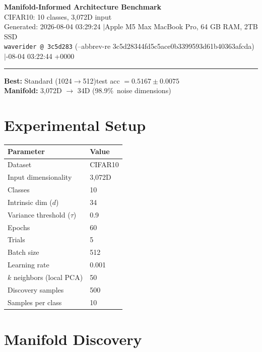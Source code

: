 \documentclass[11pt,letterpaper]{article}
\begin{document}
\begin{center}
  {\LARGE\bfseries\color{wavblue} Manifold-Informed Architecture Benchmark}\\[6pt]
  {\large CIFAR10: 10 classes, 3,072D input}\\[8pt]
  {\small Generated: 2026-08-04 03:29:24 \quad$|$\quad Apple M5 Max MacBook Pro, 64 GB RAM, 2TB SSD}\\[2pt]
  {\small\texttt{waverider @ 3c5d283} (--abbrev-re
3c5d28344fd5c5ace0b3399593d61b40363afcda) \quad$|$-08-04 03:22:44 +0000}
\end{center}
{\color{wavblue}\noindent\rule{\linewidth}{1.5pt}}
\medskip

\noindent\colorbox{wavlight}{\parbox{\dimexpr\linewidth-2\fboxsep\relax}{
  \smallskip
  \textbf{Best:} Standard (1024$\rightarrow$512)\quad test acc $= 0.5167 \pm 0.0075$\\[2pt]
  \textbf{Manifold:} 3,072D $\rightarrow$ 34D (98.9\%\ noise dimensions)\\[2pt]
  \smallskip
}}
\bigskip

\section{Experimental Setup}

\begin{tabular}{@{}ll@{}}
\toprule
\textbf{Parameter} & \textbf{Value} \\
\midrule
  Dataset & CIFAR10 \\
  Input dimensionality & 3,072D \\
  Classes & 10 \\
  Intrinsic dim ($d$) & 34 \\
  Variance threshold ($\tau$) & 0.9 \\
  Epochs & 60 \\
  Trials & 5 \\
  Batch size & 512 \\
  Learning rate & 0.001 \\
  $k$ neighbors (local PCA) & 50 \\
  Discovery samples & 500 \\
  Samples per class & 10 \\
\bottomrule
\end{tabular}

\section{Manifold Discovery}
\end{document}
